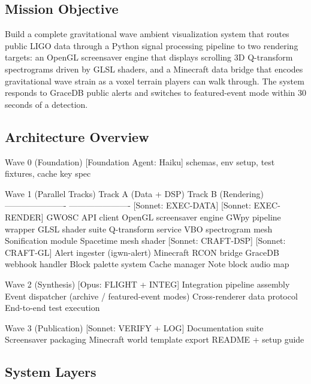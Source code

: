 \documentclass[11pt,letterpaper]{article}
\begin{document}
\subsection{Mission Objective}

Build a complete gravitational wave ambient visualization system that routes public LIGO data through a Python signal processing pipeline to two rendering targets: an OpenGL screensaver engine that displays scrolling 3D Q-transform spectrograms driven by GLSL shaders, and a Minecraft data bridge that encodes gravitational wave strain as a voxel terrain players can walk through. The system responds to GraceDB public alerts and switches to featured-event mode within 30 seconds of a detection.

\subsection{Architecture Overview}

\begin{asciibox}
Wave 0 (Foundation)
  [Foundation Agent: Haiku] schemas, env setup, test fixtures, cache key spec

Wave 1 (Parallel Tracks)
  Track A (Data + DSP)           Track B (Rendering)
  ----------------------         ----------------------
  [Sonnet: EXEC-DATA]            [Sonnet: EXEC-RENDER]
  GWOSC API client               OpenGL screensaver engine
  GWpy pipeline wrapper          GLSL shader suite
  Q-transform service            VBO spectrogram mesh
  Sonification module            Spacetime mesh shader
  [Sonnet: CRAFT-DSP]            [Sonnet: CRAFT-GL]
  Alert ingester (igwn-alert)    Minecraft RCON bridge
  GraceDB webhook handler        Block palette system
  Cache manager                  Note block audio map

Wave 2 (Synthesis)
  [Opus: FLIGHT + INTEG]
  Integration pipeline assembly
  Event dispatcher (archive / featured-event modes)
  Cross-renderer data protocol
  End-to-end test execution

Wave 3 (Publication)
  [Sonnet: VERIFY + LOG]
  Documentation suite
  Screensaver packaging
  Minecraft world template export
  README + setup guide
\end{asciibox}

\subsection{System Layers}
\end{document}
